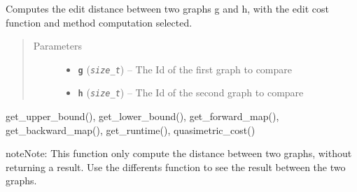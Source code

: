 \documentclass[letterpaper,10pt,english]{sphinxmanual}
\begin{document}

\begin{fulllineitems}
\label{doc:gedlibpy.run_method}
Computes the edit distance between two graphs g and h, with the edit cost function and method computation selected.
\begin{quote}\begin{description}
\item[{Parameters}] \leavevmode\begin{itemize}
\item {} 
\textbf{\texttt{g}} (\emph{\texttt{size\_t}}) -- The Id of the first graph to compare

\item {} 
\textbf{\texttt{h}} (\emph{\texttt{size\_t}}) -- The Id of the second graph to compare

\end{itemize}

\end{description}\end{quote}




get\_upper\_bound(), get\_lower\_bound(),  get\_forward\_map(), get\_backward\_map(), get\_runtime(), quasimetric\_cost()



\begin{notice}{note}{Note:}
This function only compute the distance between two graphs, without returning a result. Use the differents function to see the result between the two graphs.
\end{notice}

\end{fulllineitems}

\end{document}
